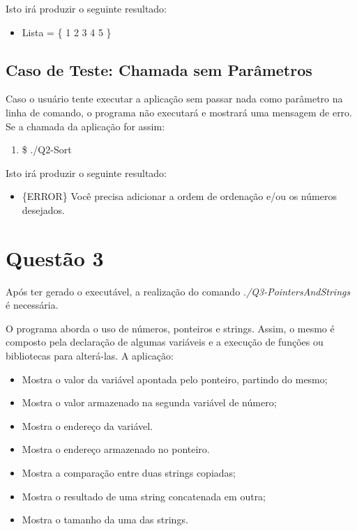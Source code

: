   Isto irá produzir o seguinte resultado:

  \begin{itemize}
    \item Lista = \{ 1 2 3 4 5 \}
  \end{itemize}

    \subsection{Caso de Teste: Chamada sem Parâmetros}

	  Caso o usuário tente executar a aplicação sem passar nada como parâmetro na linha de comando, o programa não
	  executará e mostrará uma mensagem de erro. Se a chamada da aplicação for assim:

	  \begin{enumerate}
	    \item \$ ./Q2-Sort
	  \end{enumerate}


	  Isto irá produzir o seguinte resultado:

	  \begin{itemize}
	    \item \{ERROR\} Você precisa adicionar a ordem de ordenação e/ou os números desejados.
	  \end{itemize}

\section{Questão 3}

Após ter gerado o executável, a realização do comando \textit{./Q3-PointersAndStrings} é necessária.

O programa aborda o uso de números, ponteiros e strings. Assim, o mesmo é composto pela declaração de algumas variáveis
e a execução de funções ou bibliotecas para alterá-las. A aplicação:

\begin{itemize}
    \item Mostra o valor da variável apontada pelo ponteiro, partindo do mesmo;
    \item Mostra o valor armazenado na segunda variável de número;
    \item Mostra o endereço da variável.
    \item Mostra o endereço armazenado no ponteiro.

    \item Mostra a comparação entre duas strings copiadas;
    \item Mostra o resultado de uma string concatenada em outra;
    \item Mostra o tamanho da uma das strings.
  \end{itemize}

